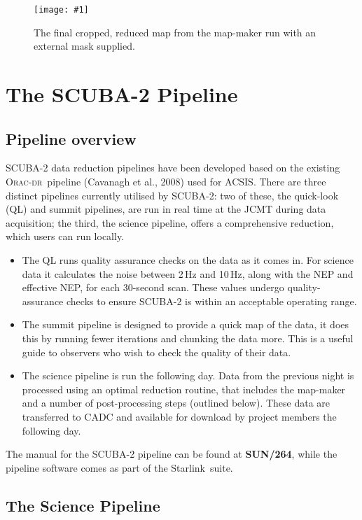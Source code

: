 \documentclass[twoside,11pt]{article}
\newcommand{\htmladdnormallink}[2]{#1}
\newcommand{\htmladdimg}[1]{}
\newcommand{\xref}[3]{#1}
\newcommand{\xlabel}[1]{}
\renewcommand{\_}{\texttt{\symbol{95}}}
\newcommand{\starlink}{\htmladdnormallink{Starlink}{http://starlink.jach.hawaii.edu}}
\newcommand{\oracdr}{\htmladdnormallink{\textsc{Orac-dr}}{http://www.oracdr.org/oracdr}}
\newcommand{\pipelinesun}{\xref{\textbf{SUN/264}}{sun264}{}}
\newcommand{\myfig}[6]{
  \begin{figure}#2
    \centering\texttt{[image: \#1]}
    \typeout{#1 inserted on page \arabic{page}}
    \caption[#5]{\label{#4}\small #6}
  \end{figure}
}
\newcommand{\myfig}[6]{
    \label{#4} \htmladdimg{#1.png}\\
    \\
    Figure: #6\\
  }
\begin{document}
\myfig{sc21_gal12_crop}{[t!]}{width=0.8\hsize}{fig:crop_map}{
  Galactic example: cropped final map}{
  The final cropped, reduced map from the map-maker run with
  an external mask supplied.
}


\clearpage
\section{\xlabel{pipeline}The SCUBA-2 Pipeline}
\label{sec:pipe}

\subsection{\xlabel{pl_overview}Pipeline overview}

SCUBA-2 data reduction pipelines have been developed based on the
existing \oracdr\ pipeline (Cavanagh et al., 2008\cite{oracdr}) used
for ACSIS. There are three distinct pipelines currently utilised by
SCUBA-2: two of these, the quick-look (QL) and summit pipelines, are
run in real time at the JCMT during data acquisition; the third, the science
pipeline, offers a comprehensive reduction, which users can run locally.

\begin{itemize}
\item The QL runs quality assurance checks on the data as it comes in.
For science data it calculates the noise between 2\,Hz and 10\,Hz,
along with the NEP and effective NEP, for each 30-second scan. These
values undergo quality-assurance checks to ensure SCUBA-2 is within
an acceptable operating range.
\item The summit pipeline is designed to provide a quick map of the
data, it does this by running fewer iterations and chunking the data
more. This is a useful guide to observers who wish to check the
quality of their data.
\item The science pipeline is run the following day. Data from the
previous night is processed using an optimal reduction routine, that
includes the map-maker and a number of post-processing steps (outlined
below). These data are transferred to CADC and available for download
by project members the following day.
\end{itemize}

The manual for the SCUBA-2 pipeline can be found at \pipelinesun,
while the pipeline software comes as part of the \starlink\ suite.


\subsection{\xlabel{science_pl}The Science Pipeline}
\end{document}

